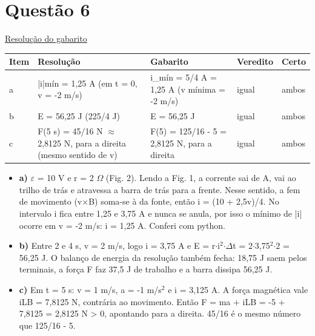 \documentclass{article}%
\begin{document}
\section*{Questão 6}%
\href{https://poliedroresolve.sistemapoliedro.com.br/vestibulares/ime/2026/ime-2-fase-dia-2-24-10-2025-2-fase-dia-2/dissertativa-6-fisica-2-fase-dia-2-ime-2026}{Resolução do gabarito}\par\smallskip%
\begin{longtable}{@{}p{} p{} p{} p{} p{}@{}}\toprule Item & Resolução & Gabarito & Veredito & Certo \\ \midrule
a & |i|mín = 1,25 A (em t = 0, v = -2 m/s) & i\_mín = 5/4 A = 1,25 A (v mínima = -2 m/s) & igual & ambos \\
b & E = 56,25 J (225/4 J) & E = 56,25 J & igual & ambos \\
c & F(5 s) = 45/16 N $\approx$ 2,8125 N, para a direita (mesmo sentido de v) & F(5) = 125/16 - 5 = 2,8125 N, para a direita & igual & ambos \\
\bottomrule\end{longtable}%
\begin{itemize}%
\item%
\textbf{a)} $\varepsilon$ = 10 V e r = 2 $\Omega$ (Fig. 2). Lendo a Fig. 1, a corrente sai de A, vai ao trilho de trás e atravessa a barra de trás para a frente. Nesse sentido, a fem de movimento (v$\times$B) soma{-}se à da fonte, então i = (10 + 2,5v)/4. No intervalo i fica entre 1,25 e 3,75 A e nunca se anula, por isso o mínimo de |i| ocorre em v = -2 m/s: i = 1,25 A. Conferi com python.%
\item%
\textbf{b)} Entre 2 e 4 s, v = 2 m/s, logo i = 3,75 A e E = r$\cdot$i$^2$$\cdot$$\Delta$t = 2$\cdot$3,75$^2$$\cdot$2 = 56,25 J. O balanço de energia da resolução também fecha: 18,75 J saem pelos terminais, a força F faz 37,5 J de trabalho e a barra dissipa 56,25 J.%
\item%
\textbf{c)} Em t = 5 s: v = 1 m/s, a = -1 m/s$^2$ e i = 3,125 A. A força magnética vale iLB = 7,8125 N, contrária ao movimento. Então F = ma + iLB = -5 + 7,8125 = 2,8125 N > 0, apontando para a direita. 45/16 é o mesmo número que 125/16 - 5.%
\end{itemize}%
\end{document}
